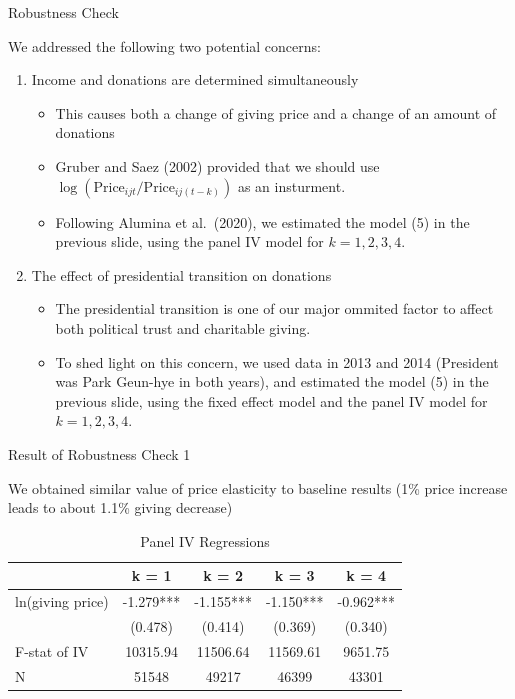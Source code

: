 \documentclass[
  ignorenonframetext,
]{beamer}
\providecommand{\tightlist}{%
  \setlength{\itemsep}{0pt}\setlength{\parskip}{0pt}}
\begin{document}
\begin{frame}{Robustness Check}
\protect\hypertarget{robustness-check}{}

We addressed the following two potential concerns:

\begin{enumerate}
\tightlist
\item
  Income and donations are determined simultaneously

  \begin{itemize}
  \tightlist
  \item
    This causes both a change of giving price and a change of an amount
    of donations
  \item
    Gruber and Saez (2002) provided that we should use
    \(\log(\text{Price}_{ijt}/\text{Price}_{ij(t-k)})\) as an
    insturment.
  \item
    Following Alumina et al.~(2020), we estimated the model (5) in the
    previous slide, using the panel IV model for \(k = 1, 2, 3, 4\).
  \end{itemize}
\item
  The effect of presidential transition on donations

  \begin{itemize}
  \tightlist
  \item
    The presidential transition is one of our major ommited factor to
    affect both political trust and charitable giving.
  \item
    To shed light on this concern, we used data in 2013 and 2014
    (President was Park Geun-hye in both years), and estimated the model
    (5) in the previous slide, using the fixed effect model and the
    panel IV model for \(k = 1, 2, 3, 4\).
  \end{itemize}
\end{enumerate}

\end{frame}

\begin{frame}{Result of Robustness Check 1}
\protect\hypertarget{result-of-robustness-check-1}{}

We obtained similar value of price elasticity to baseline results (1\%
price increase leads to about 1.1\% giving decrease)

\begin{table}

\caption{\label{tab:kableRobust1EstimateElasticity}Panel IV Regressions}
\centering
\begin{tabular}[t]{lcccc}
\toprule
 & k = 1 & k = 2 & k = 3 & k = 4\\
\midrule
ln(giving price) & -1.279*** & -1.155*** & -1.150*** & -0.962***\\
 & (0.478) & (0.414) & (0.369) & (0.340)\\
F-stat of IV & 10315.94 & 11506.64 & 11569.61 & 9651.75\\
N & 51548 & 49217 & 46399 & 43301\\
\bottomrule
\end{tabular}
\end{table}

\end{frame}
\end{document}
